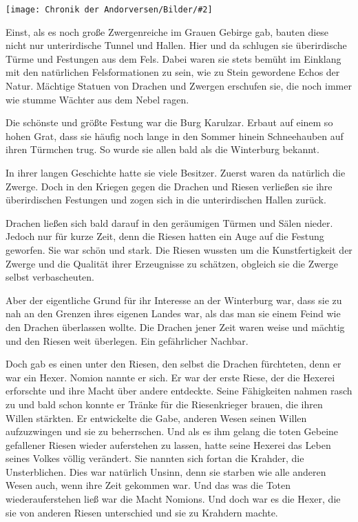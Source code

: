 \documentclass[10pt, a4paper, oneside]{book}
\newcommand{\bildmitts}[2][height=0.32\textwidth,width=0.48\textwidth,keepaspectratio]{%
    \begin{center}
        \texttt{[image: Chronik der Andorversen/Bilder/\#2]}
    \end{center}
}
\begin{document}
\begin{multicols}{2}
\bildmitts{Die Winterburg Bild 1.jpg}

Einst, als es noch große Zwergenreiche im Grauen Gebirge gab, bauten diese nicht nur unterirdische Tunnel und Hallen. Hier und da schlugen sie überirdische Türme und Festungen aus dem Fels. Dabei waren sie stets bemüht im Einklang mit den natürlichen Felsformationen zu sein, wie zu Stein gewordene Echos der Natur. Mächtige Statuen von Drachen und Zwergen erschufen sie, die noch immer wie stumme Wächter aus dem Nebel ragen.\bigskip

Die schönste und größte Festung war die Burg Karulzar. Erbaut auf einem so hohen Grat, dass sie häufig noch lange in den Sommer hinein Schneehauben auf ihren Türmchen trug. So wurde sie allen bald als die Winterburg bekannt.\bigskip

In ihrer langen Geschichte hatte sie viele Besitzer. Zuerst waren da natürlich die Zwerge. Doch in den Kriegen gegen die Drachen und Riesen verließen sie ihre überirdischen Festungen und zogen sich in die unterirdischen Hallen zurück.\bigskip

Drachen ließen sich bald darauf in den geräumigen Türmen und Sälen nieder. Jedoch nur für kurze Zeit, denn die Riesen hatten ein Auge auf die Festung geworfen. Sie war schön und stark. Die Riesen wussten um die Kunstfertigkeit der Zwerge und die Qualität ihrer Erzeugnisse zu schätzen, obgleich sie die Zwerge selbst verbascheuten.\bigskip

Aber der eigentliche Grund für ihr Interesse an der Winterburg war, dass sie zu nah an den Grenzen ihres eigenen Landes war, als das man sie einem Feind wie den Drachen überlassen wollte. Die Drachen jener Zeit waren weise und mächtig und den Riesen weit überlegen. Ein gefährlicher Nachbar.\bigskip

Doch gab es einen unter den Riesen, den selbst die Drachen fürchteten, denn er war ein Hexer. Nomion nannte er sich. Er war der erste Riese, der die Hexerei erforschte und ihre Macht über andere entdeckte. Seine Fähigkeiten nahmen rasch zu und bald schon konnte er Tränke für die Riesenkrieger brauen, die ihren Willen stärkten. Er entwickelte die Gabe, anderen Wesen seinen Willen aufzuzwingen und sie zu beherrschen. Und als es ihm gelang die toten Gebeine gefallener Riesen wieder auferstehen zu lassen, hatte seine Hexerei das Leben seines Volkes völlig verändert. Sie nannten sich fortan die Krahder, die Unsterblichen. Dies war natürlich Unsinn, denn sie starben wie alle anderen Wesen auch, wenn ihre Zeit gekommen war. Und das was die Toten wiederauferstehen ließ war die Macht Nomions. Und doch war es die Hexer, die sie von anderen Riesen unterschied und sie zu Krahdern machte.\bigskip


\end{multicols}
\end{document}
